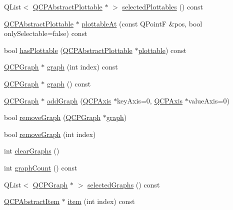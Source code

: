 \begin{DoxyCompactItemize}
Q\+List$<$ \mbox{\hyperlink{class_q_c_p_abstract_plottable}{Q\+C\+P\+Abstract\+Plottable}} $\ast$ $>$ \mbox{\hyperlink{class_q_custom_plot_a747faaab57c56891e901a1e97fa4359a}{selected\+Plottables}} () const
\item 
\mbox{\hyperlink{class_q_c_p_abstract_plottable}{Q\+C\+P\+Abstract\+Plottable}} $\ast$ \mbox{\hyperlink{class_q_custom_plot_acddbbd8b16dd633f0d94e5a736fbd8cf}{plottable\+At}} (const Q\+PointF \&pos, bool only\+Selectable=false) const
\item 
bool \mbox{\hyperlink{class_q_custom_plot_a72cefbfbb9e699940e37be605bd9c51e}{has\+Plottable}} (\mbox{\hyperlink{class_q_c_p_abstract_plottable}{Q\+C\+P\+Abstract\+Plottable}} $\ast$\mbox{\hyperlink{class_q_custom_plot_a32de81ff53e263e785b83b52ecd99d6f}{plottable}}) const
\item 
\mbox{\hyperlink{class_q_c_p_graph}{Q\+C\+P\+Graph}} $\ast$ \mbox{\hyperlink{class_q_custom_plot_a6ecae130f684b25276fb47bd3a5875c6}{graph}} (int index) const
\item 
\mbox{\hyperlink{class_q_c_p_graph}{Q\+C\+P\+Graph}} $\ast$ \mbox{\hyperlink{class_q_custom_plot_aac190865a67f19af3fdf2136774997af}{graph}} () const
\item 
\mbox{\hyperlink{class_q_c_p_graph}{Q\+C\+P\+Graph}} $\ast$ \mbox{\hyperlink{class_q_custom_plot_a6fb2873d35a8a8089842d81a70a54167}{add\+Graph}} (\mbox{\hyperlink{class_q_c_p_axis}{Q\+C\+P\+Axis}} $\ast$key\+Axis=0, \mbox{\hyperlink{class_q_c_p_axis}{Q\+C\+P\+Axis}} $\ast$value\+Axis=0)
\item 
bool \mbox{\hyperlink{class_q_custom_plot_a903561be895fb6528a770d66ac5e6713}{remove\+Graph}} (\mbox{\hyperlink{class_q_c_p_graph}{Q\+C\+P\+Graph}} $\ast$\mbox{\hyperlink{class_q_custom_plot_a6ecae130f684b25276fb47bd3a5875c6}{graph}})
\item 
bool \mbox{\hyperlink{class_q_custom_plot_a9554b3d2d5b10c0f884bd4010b6c192c}{remove\+Graph}} (int index)
\item 
int \mbox{\hyperlink{class_q_custom_plot_ab0f3abff2d2f7df3668b5836f39207fa}{clear\+Graphs}} ()
\item 
int \mbox{\hyperlink{class_q_custom_plot_a5e1787cdde868c4d3790f9ebc8207d90}{graph\+Count}} () const
\item 
Q\+List$<$ \mbox{\hyperlink{class_q_c_p_graph}{Q\+C\+P\+Graph}} $\ast$ $>$ \mbox{\hyperlink{class_q_custom_plot_ad3547aded026d8a9ae6ef13a69080d06}{selected\+Graphs}} () const
\item 
\mbox{\hyperlink{class_q_c_p_abstract_item}{Q\+C\+P\+Abstract\+Item}} $\ast$ \mbox{\hyperlink{class_q_custom_plot_ac042f2e78edd228ccf2f26b7fe215239}{item}} (int index) const

\end{DoxyCompactItemize}
